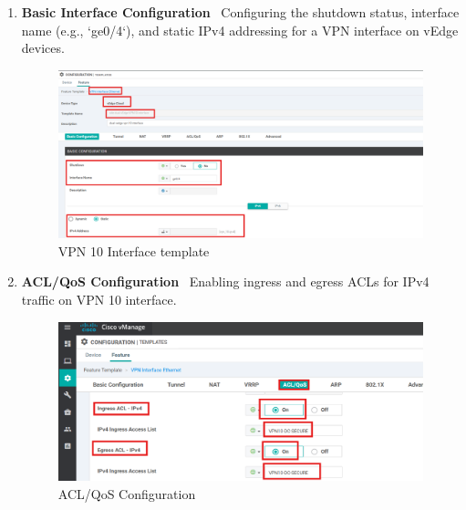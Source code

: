 \documentclass[12pt,english]{report}
\begin{document}
\begin{enumerate}
    \item \textbf{Basic Interface Configuration} \
    Configuring the shutdown status, interface name (e.g., `ge0/4`), and static IPv4 addressing for a VPN interface on vEdge devices.
\begin{figure}[H]
    \centering
    \includegraphics[width= 1 \textwidth]{chapitre 3/template/12.png}
    \caption{VPN 10 Interface template}
    \label{VPN 10 Interface template}
\end{figure}
    \item \textbf{ACL/QoS Configuration} \
    Enabling ingress and egress ACLs for IPv4 traffic on VPN 10 interface.
\begin{figure}[H]
    \centering
    \includegraphics[width= 1 \textwidth]{chapitre 3/vpn10-acl-config.png}
    \caption{ACL/QoS Configuration}
    \label{ACL/QoS Configuration}
\end{figure}
\end{enumerate}
\newpage
\end{document}
